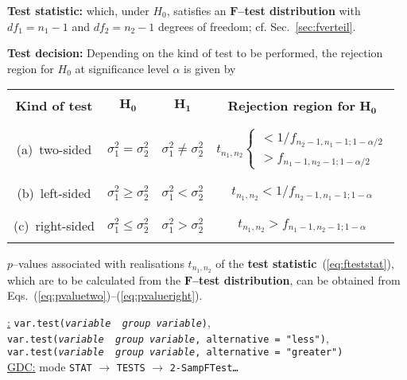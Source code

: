 \medskip
\noindent
\textbf{Test statistic:}
%
\be
{}
\ee
%
which, under $H_{0}$, satisfies an $\boldsymbol{F}$\textbf{--test
distribution} with $df_{1}=n_{1}-1$ and $df_{2}=n_{2}-1$ degrees of
freedom; cf. Sec.~\ref{sec:fverteil}.

\medskip
\noindent
\textbf{Test decision:} Depending on the kind of test to be 
performed, the rejection region for $H_{0}$ at significance level 
$\alpha$ is given by
%
\begin{center}
\begin{tabular}[h]{c|c|c|c}
 & & & \\
\textbf{Kind of test} & $\boldsymbol{H_{0}}$ &
$\boldsymbol{H_{1}}$ &
\textbf{Rejection region for} $\boldsymbol{H_{0}}$ \\
 & & & \\
\hline
 & & & \\
(a)~two-sided & $\sigma_{1}^{2}=\sigma_{2}^{2}$ & $\sigma_{1}^{2} 
\neq \sigma_{2}^{2}$ &
$t_{n_{1},n_{2}}\begin{cases} < 1/f_{n_{2}-1,n_{1}-1;1-\alpha/2} \\
> f_{n_{1}-1,n_{2}-1;1-\alpha/2} \end{cases}$ \\
 & & & \\
\hline
 & & & \\
(b)~left-sided & $\sigma_{1}^{2} \geq \sigma_{2}^{2}$ & 
$\sigma_{1}^{2} < \sigma_{2}^{2}$ &
$t_{n_{1},n_{2}} < 1/f_{n_{2}-1,n_{1}-1;1-\alpha}$ \\
 & & & \\
\hline
 & & & \\
(c)~right-sided & $\sigma_{1}^{2} \leq \sigma_{2}^{2}$ & 
$\sigma_{1}^{2} > \sigma_{2}^{2}$ &
$t_{n_{1},n_{2}} > f_{n_{1}-1,n_{2}-1;1-\alpha}$ \\
 & & &
\end{tabular}
\end{center}
%
$p$--values associated with realisations $t_{n_{1},n_{2}}$ of the
\textbf{test statistic}~(\ref{eq:fteststat}), which are to be
calculated from the
$\boldsymbol{F}$\textbf{--test distribution}, can be obtained from 
Eqs.~(\ref{eq:pvaluetwo})--(\ref{eq:pvalueright}).

\medskip
\noindent
\underline{\R:}
\texttt{var.test(\textit{variable}~\texttildelow~\textit{group
variable})}, \\
\texttt{var.test(\textit{variable}~\texttildelow~\textit{group
variable}, alternative = "less")}, \\
\texttt{var.test(\textit{variable}~\texttildelow~\textit{group
variable}, alternative = "greater")} \\
\underline{GDC:} mode \texttt{STAT} $\rightarrow$ \texttt{TESTS}
$\rightarrow$ \texttt{2-SampFTest\ldots}

